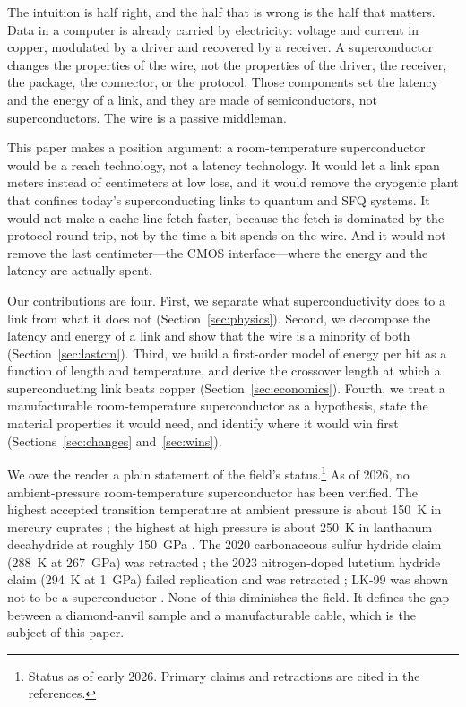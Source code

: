 \documentclass[10pt,letterpaper]{article}
\begin{document}
The intuition is half right, and the half that is wrong is the half that matters. Data in a computer is already carried by electricity: voltage and current in copper, modulated by a driver and recovered by a receiver. A superconductor changes the properties of the wire, not the properties of the driver, the receiver, the package, the connector, or the protocol. Those components set the latency and the energy of a link, and they are made of semiconductors, not superconductors. The wire is a passive middleman.

This paper makes a position argument: a room-temperature superconductor would be a reach technology, not a latency technology. It would let a link span meters instead of centimeters at low loss, and it would remove the cryogenic plant that confines today's superconducting links to quantum and SFQ systems. It would not make a cache-line fetch faster, because the fetch is dominated by the protocol round trip, not by the time a bit spends on the wire. And it would not remove the last centimeter---the CMOS interface---where the energy and the latency are actually spent.

Our contributions are four. First, we separate what superconductivity does to a link from what it does not (Section~\ref{sec:physics}). Second, we decompose the latency and energy of a link and show that the wire is a minority of both (Section~\ref{sec:lastcm}). Third, we build a first-order model of energy per bit as a function of length and temperature, and derive the crossover length at which a superconducting link beats copper (Section~\ref{sec:economics}). Fourth, we treat a manufacturable room-temperature superconductor as a hypothesis, state the material properties it would need, and identify where it would win first (Sections~\ref{sec:changes} and~\ref{sec:wins}).

We owe the reader a plain statement of the field's status.\footnote{Status as of early 2026. Primary claims and retractions are cited in the references.} As of 2026, no ambient-pressure room-temperature superconductor has been verified. The highest accepted transition temperature at ambient pressure is about 150~K in mercury cuprates \cite{schilling}; the highest at high pressure is about 250~K in lanthanum decahydride at roughly 150~GPa \cite{drozdov2019}. The 2020 carbonaceous sulfur hydride claim (288~K at 267~GPa) was retracted \cite{snider,sniderretract}; the 2023 nitrogen-doped lutetium hydride claim (294~K at 1~GPa) failed replication and was retracted \cite{dasenbrock,dasenbrockretract}; LK-99 was shown not to be a superconductor \cite{lk99}. None of this diminishes the field. It defines the gap between a diamond-anvil sample and a manufacturable cable, which is the subject of this paper.
\end{document}
